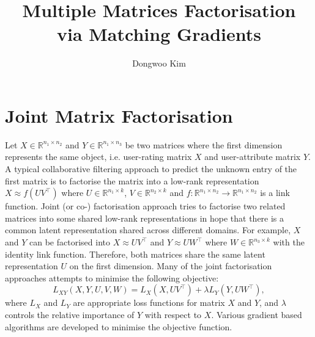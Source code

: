 \documentclass{article} %
\title{Multiple Matrices Factorisation\\ via Matching Gradients}
\author{
Dongwoo Kim
}
\theoremstyle{definition}
\begin{document}
\maketitle


\section{Joint Matrix Factorisation}
Let $X \in \mathbb{R}^{n_1 \times n_2}$ and $Y \in \mathbb{R}^{n_1 \times n_3}$ be two matrices where the first dimension represents the same object, i.e. user-rating matrix $X$ and user-attribute matrix $Y$. A typical collaborative filtering approach to predict the unknown entry of the first matrix is to factorise the matrix into a low-rank representation $X \approx f(UV^\top)$ where $U\in\mathbb{R}^{n_1\times k}$, $V\in \mathbb{R}^{n_2 \times k}$ and $f:\mathbb{R}^{n_1 \times n_2} \rightarrow \mathbb{R} ^{n_1 \times n_2}$ is a link function. Joint (or co-) factorisation approach tries to factorise two related matrices into some shared low-rank representations in hope that there is a common latent representation shared across different domains. For example, $X$ and $Y$ can be factorised into $X \approx UV^\top$ and $Y \approx UW^\top$ where $W \in \mathbb{R}^{n_3 \times k}$ with the identity link function. Therefore, both matrices share the same latent representation $U$ on the first dimension.
Many of the joint factorisation approaches attempts to minimise the following objective:
\begin{equation}
\label{eqn:joint_obj}
L_{XY}(X,Y,U,V,W) = L_X(X, UV^\top) + \lambda L_Y(Y, UW^\top),
\end{equation}
where $L_X$ and $L_Y$ are appropriate loss functions for matrix $X$ and $Y$, and $\lambda$ controls the relative importance of $Y$ with respect to $X$. Various gradient based algorithms are developed to minimise the objective function.
\end{document}
